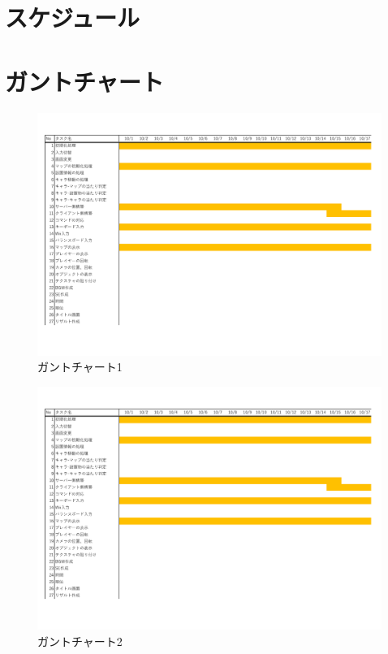\documentclass{jarticle}
\begin{document}
\section{スケジュール}

\section{ガントチャート}
\begin{figure}[H]
    \centering
    \label{table:gunt1}
    \caption{ガントチャート1}
    \includegraphics[scale=0.5, page=1]{gunt.pdf}
\end{figure}
\begin{figure}[H]
    \centering
    \label{table:gunt1}
    \caption{ガントチャート2}
    \includegraphics[scale=0.5, page=2]{gunt.pdf}
\end{figure}
\end{document}
